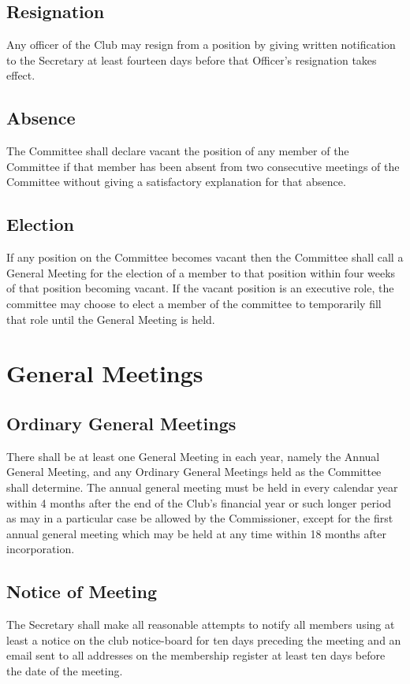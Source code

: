 \documentclass[11pt]{article} %
\begin{document}
\subsection{Resignation}
Any officer of the Club may resign from a position by giving written notification to the Secretary at least fourteen days before that Officer's resignation takes effect.
\subsection{Absence}
The Committee shall declare vacant the position of any member of the Committee if that member has been absent from two consecutive meetings of the Committee without giving a satisfactory explanation for that absence.
\subsection{Election}
If any position on the Committee becomes vacant then the Committee shall call a General Meeting for the election of a member to that position within four weeks of that position becoming vacant.
If the vacant position is an executive role, the committee may choose to elect a member of the committee to temporarily fill that role until the General Meeting is held.

\section{General Meetings}
\subsection{Ordinary General Meetings}
There shall be at least one General Meeting in each year, namely the Annual General Meeting, and any Ordinary General Meetings held as the Committee shall determine. The annual general meeting must be held in every calendar year within 4 months after the end of the Club's financial year or such longer period as may in a particular case be allowed by the Commissioner, except for the first annual general meeting which may be held at any time within 18 months after incorporation.
\subsection{Notice of Meeting}
The Secretary shall make all reasonable attempts to notify all members using at least a notice on the club notice-board for ten days preceding the meeting and an email sent to all addresses on the membership register at least ten days before the date of the meeting.
\end{document}
